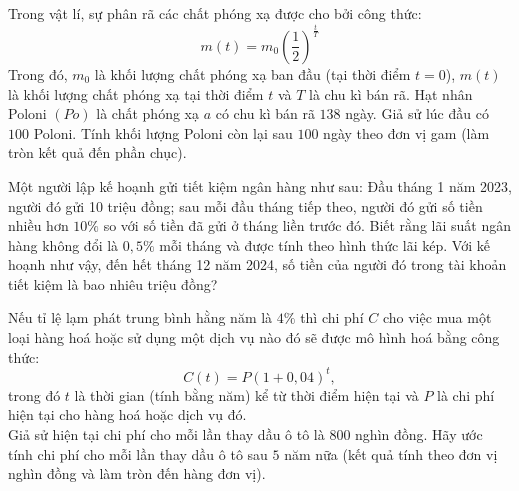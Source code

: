 \begin{ex}%
	Trong vật lí, sự phân rã các chất phóng xạ được cho  bởi công thức:
	 $$
	 m(t)=m_0\left(\dfrac{1}{2}\right)^{\tfrac{t}{T}}
	 $$
	Trong đó, $m_0$ là khối lượng chất phóng  xạ ban đầu (tại thời điểm $t=0$), $m(t)$ là khối lượng chất phóng xạ tại thời điểm $t$ và $T$ là chu kì bán rã. Hạt nhân Poloni $(P o)$ là chất phóng xạ $a$ có chu kì bán rã $138$ ngày. Giả sử lúc đầu có $100$ Poloni. Tính khối lượng Poloni còn lại sau $100$ ngày theo đơn vị gam (làm tròn kết quả đến phần chục).
\end{ex}

\begin{ex}%
	Một người lập kế hoạnh gửi tiết kiệm ngân hàng như sau: Đầu tháng 1 năm 2023, người đó gửi 10 triệu đồng; sau mỗi đầu tháng tiếp theo, người đó gửi số tiền nhiều hơn $10\%$ so với số tiền đã gửi ở  tháng liền trước đó. Biết rằng lãi suất ngân hàng không đổi là $0{,}5\%$ mỗi tháng và được tính theo hình thức lãi kép. Với kế hoạnh như vậy, đến hết tháng 12 năm 2024, số tiền của người đó trong tài khoản tiết kiệm là bao nhiêu triệu đồng?
\end{ex}

\begin{ex}%
	Nếu tỉ lệ lạm phát trung bình hằng năm là $4 \%$ thì chi phí $C$ cho việc mua một loại hàng hoá hoặc sử dụng một dịch vụ nào đó sẽ được mô hình hoá bằng công  thức:
	$$C(t)=P(1+0,04)^t,$$ 
	trong đó $t$ là thời gian (tính bằng năm) kể từ  thời điểm hiện tại và $P$ là chi phí hiện tại cho hàng hoá hoặc dịch vụ đó.\\
	Giả sử hiện tại chi phí cho mỗi lần thay dầu ô tô là $ 800 $ nghìn đồng. Hãy ước tính chi phí cho mỗi  lần thay dầu ô tô sau $ 5 $ năm nữa (kết quả tính theo đơn vị nghìn đồng và làm tròn đến hàng đơn vị).
\end{ex}

